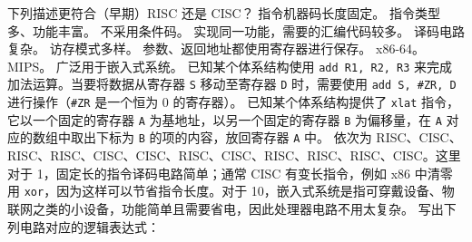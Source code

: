     \begin{problems}
        \pro 下列描述更符合（早期）RISC 还是 CISC？
            \qn 指令机器码长度固定。
            \qn 指令类型多、功能丰富。
            \qn 不采用条件码。
            \qn 实现同一功能，需要的汇编代码较多。
            \qn 译码电路复杂。
            \qn 访存模式多样。
            \qn 参数、返回地址都使用寄存器进行保存。
            \qn x86-64。
            \qn MIPS。
            \qn 广泛用于嵌入式系统。
            \qn 已知某个体系结构使用 \verb|add R1, R2, R3| 来完成加法运算。当要将数据从寄存器 \verb|S| 移动至寄存器 \verb|D| 时，需要使用 \verb|add S, #ZR, D| 进行操作（\verb|#ZR| 是一个恒为 0 的寄存器）。
            \qn 已知某个体系结构提供了 \verb|xlat| 指令，它以一个固定的寄存器 \verb|A| 为基地址，以另一个固定的寄存器 \verb|B| 为偏移量，在 \verb|A| 对应的数组中取出下标为 \verb|B| 的项的内容，放回寄存器 \verb|A| 中。
        \sol 依次为 RISC、CISC、RISC、RISC、CISC、CISC、RISC、CISC、RISC、RISC、RISC、CISC。这里对于 1，固定长的指令译码电路简单；通常 CISC 有变长指令，例如 x86 中清零用 \verb|xor|，因为这样可以节省指令长度。对于 10，嵌入式系统是指可穿戴设备、物联网之类的小设备，功能简单且需要省电，因此处理器电路不用太复杂。
        \pro 写出下列电路对应的逻辑表达式：
        \begin{figure}[H]
            \centering
\end{figure}
\end{problems}
